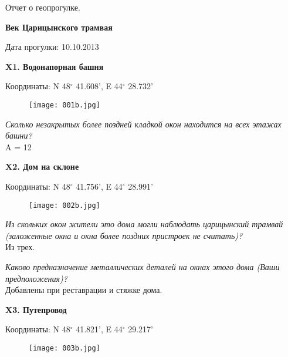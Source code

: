 \documentclass[pscyr]{hedwork}
\begin{document}
  \maketitle
  
  \newpage
  
  \begin{center}
    \large Отчет о геопрогулке.

    \bf Век Царицынского трамвая
  \end{center}
  \begin{flushright}
    Дата прогулки: 10.10.2013
  \end{flushright}

  \textbf{X1. Водонапорная башня}

  Координаты: N 48\( ^\circ \) 41.608', E 44\( ^\circ \) 28.732'

  \begin{figure}[h!]
    \center
    \texttt{[image: 001b.jpg]}
  \end{figure}

  \emph{Сколько незакрытых более поздней кладкой окон находится на всех
  этажах башни?} \\
  A = 12

  \newpage

  \textbf{X2. Дом на склоне}

  Координаты: N 48\( ^\circ \) 41.756', E 44\( ^\circ \) 28.991'

  \begin{figure}[h!]
    \center
    \texttt{[image: 002b.jpg]}
  \end{figure}

  \emph{Из скольких окон жители это дома могли наблюдать царицынский трамвай
  (заложенные окна и окна более поздних пристроек не считать)?} \\
  Из трех.

  \emph{Каково предназначение металлических деталей на окнах этого дома
  (Ваши предположения)?} \\
  Добавлены при реставрации и стяжке дома.

  \newpage

  \textbf{X3. Путепровод}

  Координаты: N 48\( ^\circ \) 41.821', E 44\( ^\circ \) 29.217'

  \begin{figure}[h!]
    \center
    \texttt{[image: 003b.jpg]}
  \end{figure}

  \newpage
\end{document}
